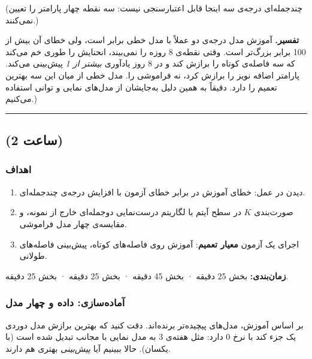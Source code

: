 (چندجمله‌ای درجه‌ی سه اینجا قابل اعتبارسنجی نیست: سه نقطه چهار پارامتر را
تعیین نمی‌کنند.)

\textbf{تفسیر.}  آموزش مدل درجه‌ی دو عملاً با مدل خطی برابر است،
ولی خطای  آن بیش از 100 برابر بزرگ‌تر است. وقتی نقطه‌ی 8 روزه را
نمی‌بیند، انحنایش را طوری خم می‌کند که سه فاصله‌ی کوتاه را برازش کند و در 8
روز یادآوری \emph{بیشتر از 1} پیش‌بینی می‌کند. پارامتر اضافه نویز را برازش
کرد، نه فراموشی را. مدل خطی از میان این سه بهترین تعمیم را دارد. دقیقاً
به همین دلیل به‌جایشان از مدل‌های نمایی و توانی استفاده می‌کنیم.)

\begin{center}\rule{0.5\linewidth}{0.5pt}\end{center}


\subsection{\texorpdfstring{ (2 ساعت)}{lab (2 ساعت)}}

\subsubsection{اهداف}

\begin{enumerate}
\def\labelenumi{\arabic{enumi}.}
\tightlist
\item
  دیدن  در عمل: خطای آموزش در برابر خطای آزمون با افزایش
  درجه‌ی چندجمله‌ای.
\item
  صورت‌بندی  \(K\) در سطح آیتم با لگاریتم درست‌نمایی
  دوجمله‌ای خارج از نمونه، و مقایسه‌ی چهار مدل فراموشی.
\item
  اجرای یک آزمون \textbf{معیار تعمیم}: آموزش روی فاصله‌های کوتاه، پیش‌بینی
  فاصله‌های طولانی.
\end{enumerate}

\textbf{زمان‌بندی:} بخش  25 دقیقه · بخش  45 دقیقه · بخش
 25 دقیقه · بخش  25 دقیقه.

\subsubsection{آماده‌سازی: داده و چهار مدل}

بر اساس  آموزش، مدل‌های پیچیده‌تر برنده‌اند. دقت کنید که بهترین
برازش مدل دوردی یک جزء کند با نرخ 0 دارد: مثل هفته‌ی 3 به مدل نمایی با
مجانب تبدیل شده است (با  یکسان). حالا ببینیم آیا \emph{پیش‌بینی}
بهتری هم دارند.

